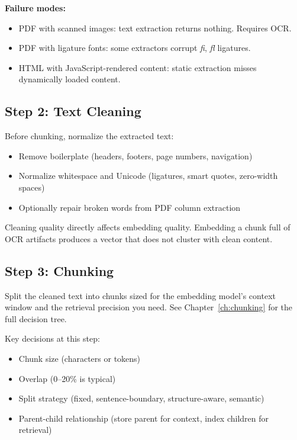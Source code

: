 \textbf{Failure modes:}

\begin{itemize}
    \item PDF with scanned images: text extraction returns nothing. Requires OCR.
    \item PDF with ligature fonts: some extractors corrupt \textit{fi}, \textit{fl} ligatures.
    \item HTML with JavaScript-rendered content: static extraction misses dynamically loaded content.
\end{itemize}

\subsection{Step 2: Text Cleaning}

Before chunking, normalize the extracted text:

\begin{itemize}
    \item Remove boilerplate (headers, footers, page numbers, navigation)
    \item Normalize whitespace and Unicode (ligatures, smart quotes, zero-width spaces)
    \item Optionally repair broken words from PDF column extraction
\end{itemize}

Cleaning quality directly affects embedding quality. Embedding a chunk full of OCR artifacts
produces a vector that does not cluster with clean content.

\subsection{Step 3: Chunking}

Split the cleaned text into chunks sized for the embedding model's context window and the
retrieval precision you need. See Chapter~\ref{ch:chunking} for the full decision tree.

Key decisions at this step:

\begin{itemize}
    \item Chunk size (characters or tokens)
    \item Overlap (0--20\% is typical)
    \item Split strategy (fixed, sentence-boundary, structure-aware, semantic)
    \item Parent-child relationship (store parent for context, index children for retrieval)
\end{itemize}


